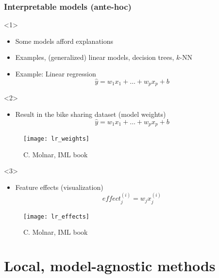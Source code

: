 \begin{frame}
  \frametitle{Interpretable models (ante-hoc)}
  \begin{onlyenv}<1>
    \begin{itemize}
    \item Some models afford explanations
    \item Examples, (generalized) linear models, decision trees, $k$-NN
    \item Example: Linear regression
      \begin{equation*}
        \hat{y} = w_1x_1 + \dotsc + w_px_p + b
      \end{equation*}
    \end{itemize}
  \end{onlyenv}
  \begin{onlyenv}<2>
    \begin{itemize}
    \item Result in the bike sharing dataset (model weights)
      \begin{equation*}
        \hat{y} = w_1x_1 + \dotsc + w_px_p + b
      \end{equation*}
    \end{itemize}
    \begin{center}
      \begin{figure}
        \texttt{[image: lr\_weights]}
        \caption{\footnotesize C. Molnar, IML book}
      \end{figure}
    \end{center}
  \end{onlyenv}
  \begin{onlyenv}<3>
    \begin{itemize}
    \item Feature effects (visualization)
      \begin{equation}
        effect_j^{(i)} = w_jx_j^{(i)}
      \end{equation}
    \end{itemize}
    \begin{center}
      \begin{figure}
        \texttt{[image: lr\_effects]}
        \caption{\footnotesize C. Molnar, IML book}
      \end{figure}
    \end{center}
  \end{onlyenv}
\end{frame}

\section{Local, model-agnostic methods}

